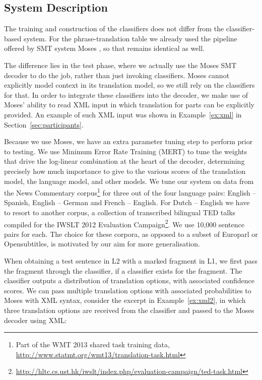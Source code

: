 \subsection{System Description}

The training and construction of the classifiers does not differ from the
classifier-based system. For the phrase-translation table we already used the
pipeline offered by SMT system Moses \citep{MOSES}, so that remains identical as
well.

The difference lies in the test phase, where we actually use the Moses
SMT decoder to do the job, rather than just invoking
classifiers. Moses cannot explicitly model context in its translation
model, so we still rely on the classifiers for that. In order to
integrate these classifiers into the decoder, we make use of Moses'
ability to read XML input in which translation for parts can be
explicitly provided. An example of such XML input was shown in
Example~\ref{ex:xml} in Section~\ref{sec:participants}.

Because we use Moses, we have an extra parameter tuning step to perform prior
to testing. We use Minimum Error Rate Training (MERT) \citep{MERT} to tune the
weights that drive the log-linear combination at the heart of the decoder,
determining precisely how much importance to give to the various scores of the
translation model, the language model, and other models. We tune our system on
data from the News Commentary corpus\footnote{Part of the WMT 2013 shared task
training data, \url{http://www.statmt.org/wmt13/translation-task.html}} for
three out of the four language pairs: English -- Spanish, English -- German and
French -- English. For Dutch -- English we have to resort to another corpus, a
collection of transcribed bilingual TED talks compiled for the IWSLT 2012
Evaluation
Campaign\footnote{\url{http://hltc.cs.ust.hk/iwslt/index.php/evaluation-campaign/ted-task.html}}.
We use 10,000 sentence pairs for each. The choice for these corpora, as opposed
to a subset of Europarl or Opensubtitles, is motivated by our aim for more
generalisation.

When obtaining a test sentence in L2 with a marked fragment in L1, we first
pass the fragment through the classifier, if a classifier exists for the
fragment. The classifier outputs a distribution of translation
options, with associated confidence scores. We can pass multiple translation
options with associated probabilities to Moses with XML syntax, consider the
excerpt in Example~\ref{ex:xml2}, in which three translation options are
received from the classifier and passed to the Moses decoder using XML:

